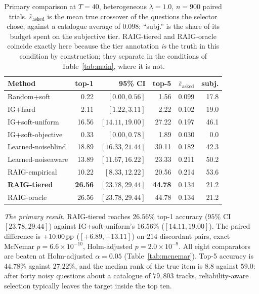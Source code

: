 \begin{table}[t]
\caption{Primary comparison at $T=40$, heterogeneous $\lambda = 1.0$,
$n = 900$ paired trials. $\bar\varepsilon_{\text{asked}}$ is the mean true
crossover of the questions the selector chose, against a catalogue average of
$0.098$; ``subj.'' is the share of its budget spent on the subjective tier.
RAIG-tiered and RAIG-oracle coincide exactly here because the tier annotation
\emph{is} the truth in this condition by construction; they separate in the
conditions of Table~\ref{tab:main}, where it is not.}
\label{tab:primary}
\centering
\footnotesize
\begin{tabular}{@{}lrrrrr@{}}
\toprule
\textbf{Method} & \textbf{top-1} & \textbf{95\% CI} & \textbf{top-5} &
\textbf{$\bar\varepsilon_{\text{asked}}$} & \textbf{subj.} \\
\midrule
Random+soft        & 0.22  & $[0.00, 0.56]$   & 1.56  & 0.099 & 17.8 \\
IG+hard            & 2.11  & $[1.22, 3.11]$   & 2.22  & 0.102 & 19.0 \\
IG+soft-uniform    & 16.56 & $[14.11, 19.00]$ & 27.22 & 0.197 & 46.1 \\
IG+soft-objective  & 0.33  & $[0.00, 0.78]$   & 1.89  & 0.030 & 0.0  \\
Learned-noiseblind & 18.89 & $[16.33, 21.44]$ & 30.11 & 0.182 & 42.3 \\
Learned-noiseaware & 13.89 & $[11.67, 16.22]$ & 23.33 & 0.211 & 50.2 \\
RAIG-empirical     & 10.22 & $[8.33, 12.22]$  & 20.56 & 0.214 & 53.6 \\
\textbf{RAIG-tiered} & \textbf{26.56} & $[23.78, 29.44]$ & \textbf{44.78} & 0.134 & 21.2 \\
RAIG-oracle        & 26.56 & $[23.78, 29.44]$ & 44.78 & 0.134 & 21.2 \\
\bottomrule
\end{tabular}
\end{table}

\emph{The primary result.} RAIG-tiered reaches $26.56\%$ top-1 accuracy
($95\%$ CI $[23.78, 29.44]$) against IG+soft-uniform's $16.56\%$
($[14.11, 19.00]$). The paired difference is $+10.00\,\text{pp}$
($[+6.89, +13.11]$) on $214$ discordant pairs, exact McNemar
$p = 6.6\times10^{-10}$, Holm-adjusted $p = 2.0\times10^{-9}$. All eight
comparators are beaten at Holm-adjusted $\alpha = 0.05$
(Table~\ref{tab:mcnemar}). Top-5 accuracy is $44.78\%$ against $27.22\%$, and
the median rank of the true item is $8.8$ against $59.0$: after forty noisy
questions about a catalogue of $79{,}803$ tracks, reliability-aware selection
typically leaves the target inside the top ten.

